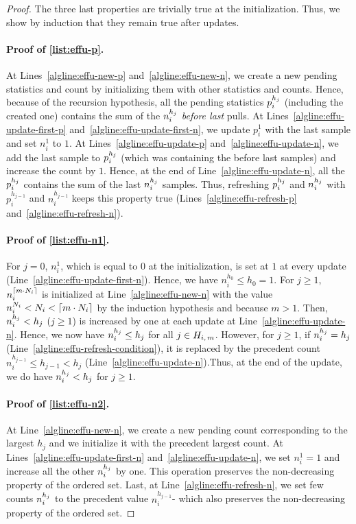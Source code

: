 \begin{proof}
The three last properties are trivially true at the initialization. Thus, we show by induction that they remain true after updates.
\paragraph{Proof of \ref{list:effu-p}. } At Lines~\ref{algline:effu-new-p} and~\ref{algline:effu-new-n}, we create a new pending statistics and count by initializing them with other statistics and counts. Hence, because of the recursion hypothesis, all the pending statistics $p_i^{h_j}$ (including the created one) contains the sum of the $n_i^{h_j}$ \emph{before last} pulls. At Lines~\ref{algline:effu-update-first-p} and~\ref{algline:effu-update-first-n}, we update $p_i^1$ with the last sample and set $n_i^1$ to $1$. At Lines~\ref{algline:effu-update-p} and~\ref{algline:effu-update-n}, we add the last sample to $p_i^{h_j}$ (which was containing the before last samples) and increase the count by $1$. Hence, at the end of Line~\ref{algline:effu-update-n}, all the $p_i^{h_j}$ contains the sum of the last $n_i^{h_j}$ samples. Thus, refreshing $p_i^{h_j}$ and $n_i^{h_j}$ with $ p_i^{h_{j-1}}$ and $n_i^{h_{j-1}}$ keeps this property true (Lines~\ref{algline:effu-refresh-p} and~\ref{algline:effu-refresh-n}). 

\paragraph{Proof of \ref{list:effu-n1}.}
For $j=0$, $n_i^1$, which is equal to $0$ at the initialization, is set at $1$ at every update (Line~\ref{algline:effu-update-first-n}). Hence, we have $n_i^{h_0} \leq h_0=1$.
For $j\geq 1$, $n_i^{\left\lceil m \cdot N_i\right\rceil}$ is initialized at Line~\ref{algline:effu-new-n} with the value $n_i^{N_i} < N_i < \left\lceil m \cdot N_i\right\rceil$ by the induction hypothesis and because $m>1$.  Then, $n_i^{h_j} < h_j$ ($j\geq1$) is increased by one at each update at Line~\ref{algline:effu-update-n}. Hence, we now have $n_i^{h_j} \leq  h_j$ for all $j\in H_{i,\,m}$. However, for $j\geq 1$, if $n_i^{h_j} = h_j$ (Line~\ref{algline:effu-refresh-condition}), it is replaced by the precedent count $n_i^{h_{j-1}}\leq h_{j-1} < h_j$ (Line~\ref{algline:effu-update-n}).Thus, at the end of the update, we do have $n_i^{h_j} < h_j$ for $j\geq1$.

\paragraph{Proof of \ref{list:effu-n2}.}
At Line~\ref{algline:effu-new-n}, we create a new pending count corresponding to the largest $h_j$ and we initialize it with the precedent largest count. At Lines~\ref{algline:effu-update-first-n} and~\ref{algline:effu-update-n}, we set $n_i^1 =1$ and increase all the other $n_i^{h_j}$ by one. This operation preserves the non-decreasing property of the ordered set. Last, at Line~\ref{algline:effu-refresh-n}, we set few counts $n_i^{h_j}$ to the precedent value $n_i^{h_{j-1}}$- which also preserves the non-decreasing property of the ordered set. 


\end{proof}
